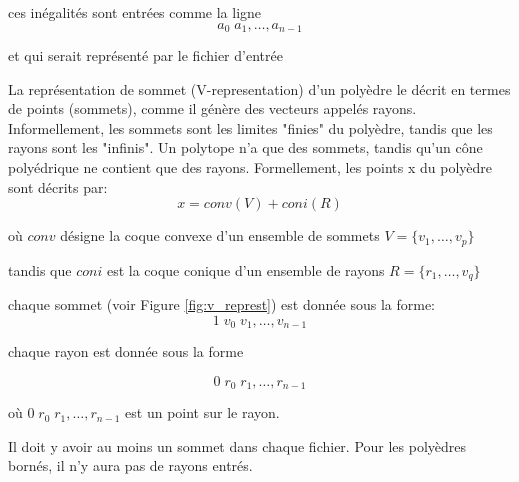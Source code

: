ces inégalités sont entrées comme la ligne 
\begin{equation}
      {a}_{0} \; {a}_{1}, \ldots ,{a}_{n-1}    
\end{equation}

et qui serait représenté par le fichier d’entrée 


 \begin{figure}[ht]
	\centering
{}
	\label{fig:ex_hreprest}
\end{figure}


\vspace*{.5cm}

La représentation de sommet (V-representation) d'un polyèdre le décrit en termes de points (sommets), comme il génère des vecteurs appelés rayons. Informellement, les sommets sont les limites "finies" du polyèdre, tandis que les rayons sont les "infinis". Un polytope n'a que des sommets, tandis qu'un cône polyédrique ne contient que des rayons. Formellement, les points x du polyèdre sont décrits par:
$$x=conv(V)+coni(R)$$

où $conv$ désigne la coque convexe d'un ensemble de sommets $V=\{ v_1,\ldots, v_p \}$

tandis que $coni$ est la coque conique d'un ensemble de rayons $R=\{ r_1,\ldots, v_q \}$


chaque sommet (voir Figure \ref{fig:v_represt}) est donnée sous la forme:
\begin{equation}
      1 \;{v}_{0} \; {v}_{1}, \ldots ,{v}_{n-1}    
\end{equation}

chaque rayon est donnée sous la forme 

\begin{equation}
      0 \;{r}_{0} \; {r}_{1}, \ldots ,{r}_{n-1}    
\end{equation}

où  $ 0 \;{r}_{0} \; {r}_{1}, \ldots ,{r}_{n-1}$ est un point sur le rayon.


Il doit y avoir au moins un sommet dans chaque fichier. Pour les polyèdres bornés, il n’y aura pas de rayons entrés.\\

